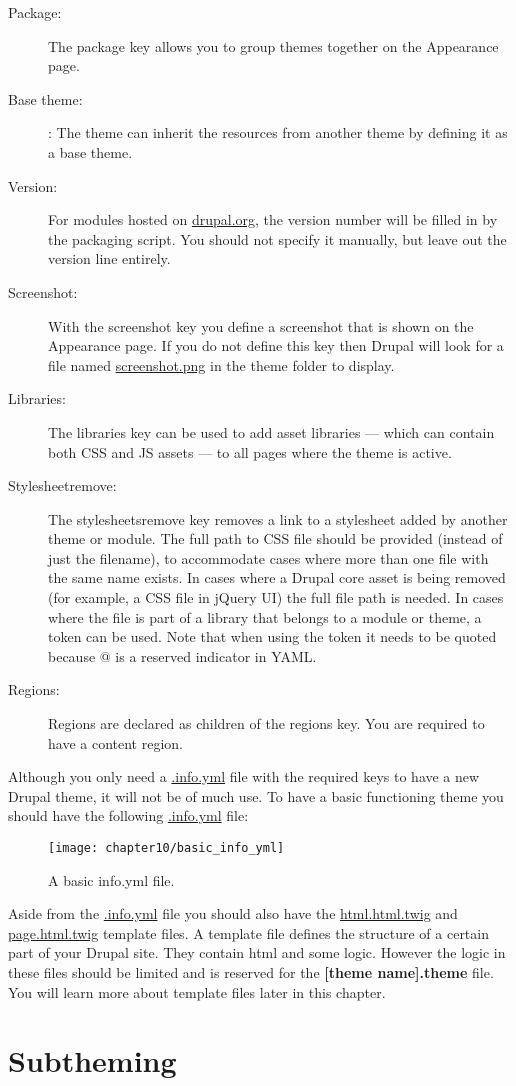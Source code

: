 \begin{description}
	\item[Package:] The package key allows you to group themes together on the Appearance page.
	\item[Base theme:] : The theme can inherit the resources from another theme by defining it as a base theme.
	\item[Version:] For modules hosted on \url{drupal.org}, the version number will be filled in by the packaging script. You should not specify it manually, but leave out the version line entirely.
	\item[Screenshot:] With the screenshot key you define a screenshot that is shown on the	Appearance page. If you do not define this key then Drupal will look for a file named \url{screenshot.png} in the theme folder to display.
	\item[Libraries:] The libraries key can be used to add asset libraries — which can contain both CSS and JS assets — to all pages where the theme is active.
	\item[Stylesheet­remove:] The stylesheets­remove key removes a link to a stylesheet added by another theme or module. The full path to CSS file should be provided (instead of just the filename), to accommodate cases where more than one file with the same name exists. In cases where a Drupal core asset is being removed (for example, a CSS file in jQuery UI) the full file path is needed. In cases where the file is part of a library that belongs to a module or theme, a token can be used. Note that when using the token it needs to be quoted because @ is a reserved indicator in YAML.
	\item[Regions:] Regions are declared as children of the regions key. You are required to have a content region.
\end{description}

Although you only need a \url{.info.yml} file with the required keys to have a new Drupal theme, it will not be of much use. To have a basic functioning theme you should have the following \url{.info.yml} file:

\begin{figure}[H]
	\centering
	\texttt{[image: chapter10/basic\_info\_yml]}
	\caption{A basic info.yml file.}
	\label{fig:basic_info_yml}
\end{figure}

Aside from the \url{.info.yml} file you should also have the \url{html.html.twig} and \url{page.html.twig} template files. A template file defines the structure of a certain part of your Drupal site. They contain html and some logic. However the logic in these files should be limited and is reserved for the \textbf{[theme name].theme} file. You will learn more about template files later in this chapter.

\section{Subtheming}

